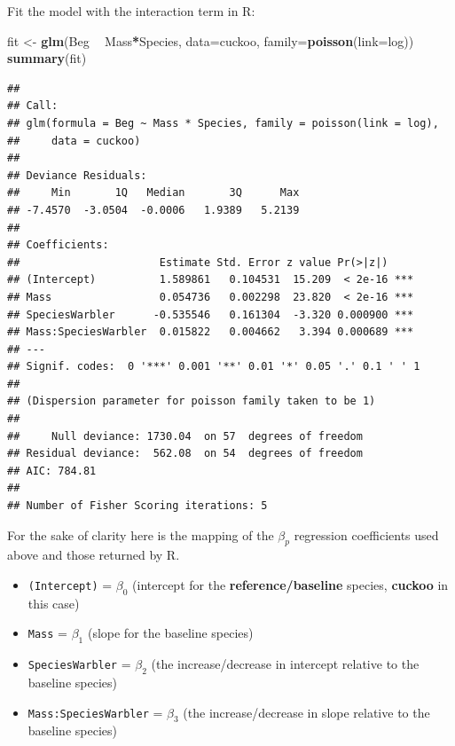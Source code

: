 \documentclass[]{book}
\newenvironment{Shaded}{\begin{snugshade}}{\end{snugshade}}
\newcommand{\KeywordTok}[1]{\textcolor[rgb]{0.13,0.29,0.53}{\textbf{#1}}}
\newcommand{\DataTypeTok}[1]{\textcolor[rgb]{0.13,0.29,0.53}{#1}}
\newcommand{\StringTok}[1]{\textcolor[rgb]{0.31,0.60,0.02}{#1}}
\newcommand{\OperatorTok}[1]{\textcolor[rgb]{0.81,0.36,0.00}{\textbf{#1}}}
\newcommand{\NormalTok}[1]{#1}
\providecommand{\tightlist}{%
  \setlength{\itemsep}{0pt}\setlength{\parskip}{0pt}}
\theoremstyle{definition}
\theoremstyle{definition}
\theoremstyle{definition}
\theoremstyle{remark}
\begin{document}
Fit the model with the interaction term in R:

\begin{Shaded}
\begin{Highlighting}[]
\NormalTok{fit <-}\StringTok{ }\KeywordTok{glm}\NormalTok{(Beg }\OperatorTok{~}\StringTok{ }\NormalTok{Mass}\OperatorTok{*}\NormalTok{Species, }\DataTypeTok{data=}\NormalTok{cuckoo, }\DataTypeTok{family=}\KeywordTok{poisson}\NormalTok{(}\DataTypeTok{link=}\NormalTok{log))}
\KeywordTok{summary}\NormalTok{(fit)}
\end{Highlighting}
\end{Shaded}

\begin{verbatim}
## 
## Call:
## glm(formula = Beg ~ Mass * Species, family = poisson(link = log), 
##     data = cuckoo)
## 
## Deviance Residuals: 
##     Min       1Q   Median       3Q      Max  
## -7.4570  -3.0504  -0.0006   1.9389   5.2139  
## 
## Coefficients:
##                      Estimate Std. Error z value Pr(>|z|)    
## (Intercept)          1.589861   0.104531  15.209  < 2e-16 ***
## Mass                 0.054736   0.002298  23.820  < 2e-16 ***
## SpeciesWarbler      -0.535546   0.161304  -3.320 0.000900 ***
## Mass:SpeciesWarbler  0.015822   0.004662   3.394 0.000689 ***
## ---
## Signif. codes:  0 '***' 0.001 '**' 0.01 '*' 0.05 '.' 0.1 ' ' 1
## 
## (Dispersion parameter for poisson family taken to be 1)
## 
##     Null deviance: 1730.04  on 57  degrees of freedom
## Residual deviance:  562.08  on 54  degrees of freedom
## AIC: 784.81
## 
## Number of Fisher Scoring iterations: 5
\end{verbatim}

For the sake of clarity here is the mapping of the \(\beta_p\)
regression coefficients used above and those returned by R.

\begin{itemize}
\tightlist
\item
  \texttt{(Intercept)} = \(\beta_0\) (intercept for the
  \textbf{reference/baseline} species, \textbf{cuckoo} in this case)
\item
  \texttt{Mass} = \(\beta_1\) (slope for the baseline species)
\item
  \texttt{SpeciesWarbler} = \(\beta_2\) (the increase/decrease in
  intercept relative to the baseline species)
\item
  \texttt{Mass:SpeciesWarbler} = \(\beta_3\) (the increase/decrease in
  slope relative to the baseline species)
\end{itemize}
\end{document}
